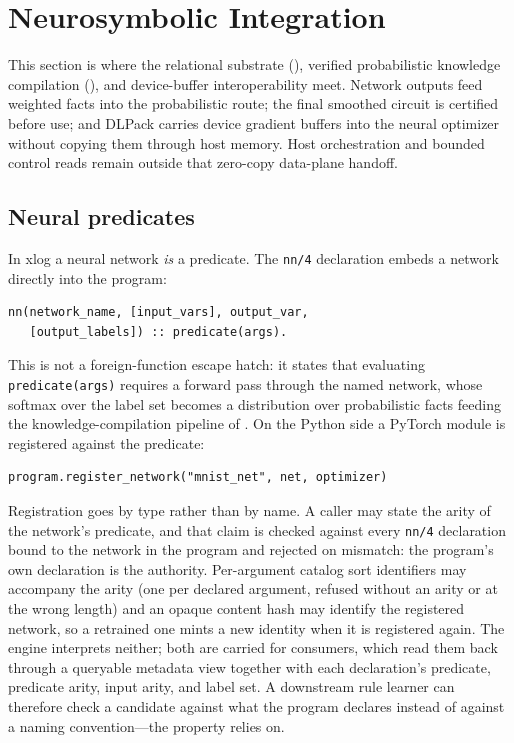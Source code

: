 \section{Neurosymbolic Integration}\label{sec:nesy}

This section is where the relational substrate (), verified probabilistic knowledge compilation (), and device-buffer interoperability meet. Network outputs feed weighted facts into the probabilistic route; the final smoothed circuit is certified before use; and DLPack carries device gradient buffers into the neural optimizer without copying them through host memory. Host orchestration and bounded control reads remain outside that zero-copy data-plane handoff.

\subsection{Neural predicates}\label{subsec:neural-pred}

In xlog a neural network \emph{is} a predicate. The \texttt{nn/4} declaration embeds a network directly into the program:

\begin{lstlisting}[style=xlogstyle,
                   caption={Neural predicate declaration (\texttt{nn/4}).},
                   label={lst:nn-decl}]
nn(network_name, [input_vars], output_var,
   [output_labels]) :: predicate(args).
\end{lstlisting}

This is not a foreign-function escape hatch: it states that evaluating \texttt{predicate(args)} requires a forward pass through the named network, whose softmax over the label set becomes a distribution over probabilistic facts feeding the knowledge-compilation pipeline of . On the Python side a PyTorch module is registered against the predicate:

\begin{lstlisting}[style=pythonstyle,
                   caption={Registering a PyTorch module against a neural predicate.},
                   label={lst:nn-register}]
program.register_network("mnist_net", net, optimizer)
\end{lstlisting}

Registration goes by type rather than by name. A caller may state the arity of the network's predicate, and that claim is checked against every \texttt{nn/4} declaration bound to the network in the program and rejected on mismatch: the program's own declaration is the authority. Per-argument catalog sort identifiers may accompany the arity (one per declared argument, refused without an arity or at the wrong length) and an opaque content hash may identify the registered network, so a retrained one mints a new identity when it is registered again. The engine interprets neither; both are carried for consumers, which read them back through a queryable metadata view together with each declaration's predicate, predicate arity, input arity, and label set. A downstream rule learner can therefore check a candidate against what the program declares instead of against a naming convention---the property  relies on.

